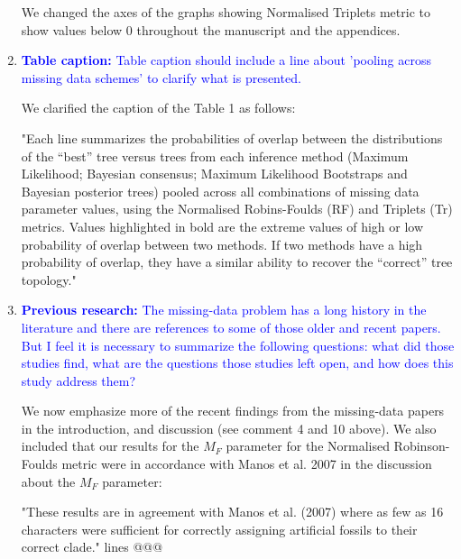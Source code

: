\documentclass[12pt,letterpaper]{article}
\begin{document}
\begin{enumerate}
We changed the axes of the graphs showing Normalised Triplets metric to show values below 0 throughout the manuscript and the appendices.


\item{\textcolor{blue}{\textbf{Table caption:} Table caption should include a line about 'pooling across missing data schemes' to clarify what is presented.}}

We clarified the caption of the Table 1 as follows:

"Each line summarizes the probabilities of overlap between the distributions of the ``best'' tree versus trees from each inference method (Maximum Likelihood; Bayesian consensus; Maximum Likelihood Bootstraps and Bayesian posterior trees) pooled across all combinations of missing data parameter values, using the Normalised Robins-Foulds (RF) and Triplets (Tr) metrics. 
Values highlighted in bold are the extreme values of high or low probability of overlap between two methods. If two methods have a high probability of overlap, they have a similar ability to recover the ``correct'' tree topology." 

\item{\textcolor{blue}{\textbf{Previous research:} The missing-data problem has a long history in the literature and there are references to some of those older and recent papers.
But I feel it is necessary to summarize the following questions: what did those studies find, what are the questions those studies left open, and how does this study address them?}}

We now emphasize more of the recent findings from the missing-data papers in the introduction, and discussion (see comment 4 and 10 above).
We also included that our results for the $M_F$ parameter for the Normalised Robinson-Foulds metric were in accordance with Manos et al. 2007 in the discussion about the $M_F$ parameter:

"These results are in agreement with Manos et al. (2007) where as few as 16 characters were sufficient for correctly assigning artificial fossils to their correct clade." lines @@@


\end{enumerate}
\end{document}
